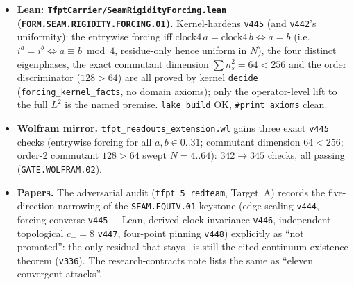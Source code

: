 \begin{itemize}
external MMST fact (continuum existence of the chiral scaling limit) empirically at the next order. \mE\ the
ground-state correlation matrix is an exact projector $G^2{=}G$ ($\sim10^{-13}$), so the state is quasi-free (the
MMST CAR hypothesis holds); \mE\ the edge four-point cross-ratio $Q{=}[G_{01}G_{23}]/[G_{02}G_{13}]$ at commensurate
positions is Cauchy-convergent under refinement; \mE\ $Q$ converges to the free-fermion conformal cross-ratio
$\sin(5\pi/12)/\sin(\pi/12){=}2{+}\sqrt3\approx3.732$; \mE\ the bulk control is off-scale (exponential). \mC\ so the
one external fact is supported at \emph{both} two-point (\texttt{v444}) and four-point order. \texttt{SEAM.EQUIV.01}
stays \mO.
\item \textbf{Lean: \texttt{TfptCarrier/SeamRigidityForcing.lean} (\texttt{FORM.SEAM.RIGIDITY.FORCING.01}).}
Kernel-hardens \texttt{v445} (and \texttt{v442}'s uniformity): the entrywise forcing iff
$\mathrm{clock4}\,a{=}\mathrm{clock4}\,b\Leftrightarrow a{=}b$ (i.e.\ $i^a{=}i^b\Leftrightarrow a\equiv b\bmod4$,
residue-only hence uniform in $N$), the four distinct eigenphases, the exact commutant dimension
$\sum n_s^2{=}64{<}256$ and the order discriminator ($128{>}64$) are all proved by kernel \texttt{decide}
(\texttt{forcing\_kernel\_facts}, no domain axioms); only the operator-level lift to the full $L^2$ is the named
premise. \texttt{lake build} OK, \texttt{\#print axioms} clean.
\item \textbf{Wolfram mirror.} \texttt{tfpt\_readouts\_extension.wl} gains three exact \texttt{v445} checks (entrywise
forcing for all $a,b\in0..31$; commutant dimension $64{<}256$; order-2 commutant $128{>}64$ swept $N{=}4..64$):
$342\to345$ checks, all passing (\texttt{GATE.WOLFRAM.02}).
\item \textbf{Papers.} The adversarial audit (\texttt{tfpt\_5\_redteam}, Target~A) records the five-direction
narrowing of the \texttt{SEAM.EQUIV.01} keystone (edge scaling \texttt{v444}, forcing converse \texttt{v445}
$+$ Lean, derived clock-invariance \texttt{v446}, independent topological $c_-{=}8$ \texttt{v447}, four-point
pinning \texttt{v448}) explicitly as ``not promoted'': the only residual that stays \mO\ is still the cited
continuum-existence theorem (\texttt{v336}). The research-contracts note lists the same as ``eleven convergent
attacks''.
\end{itemize}

